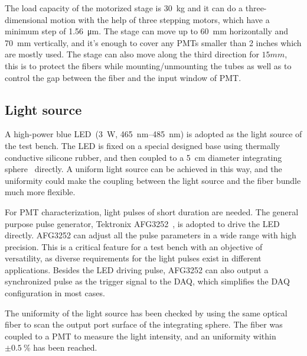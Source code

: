 \documentclass{JINST}
\begin{document}
The load capacity of the motorized stage is \SI{30}{\kilo\gram} and it can do a three-dimensional motion with the help of three stepping motors, which have a minimum step of \SI{1.56}{\micro\meter}.
The stage can move up to \SI{60}{\milli\meter} horizontally and \SI{70}{\milli\meter} vertically, and it's enough to cover any PMTs smaller than 2 inches which are mostly used.
The stage can also move along the third direction for $15mm$, this is to protect the fibers while mounting/unmounting the tubes as well as to control the gap between the fiber and the input window of PMT.
	
\subsection{Light source}
\label{sec:light_source}
	
A high-power blue LED~\cite{z-light}(\SI{3}{\watt},  \SIrange{465}{485}{\nano\meter}) is adopted as the light source of the test bench.
The LED is fixed on a special designed base using thermally conductive silicone rubber, and then coupled to a  \SI{5}{\centi\meter} diameter integrating sphere~\cite{integrating_sphere} directly.
A uniform light source can be achieved in this way, and the uniformity could make the coupling between the light source and the fiber bundle much more flexible.
	
For PMT characterization, light pulses of short duration are needed.
The general purpose pulse generator, Tektronix AFG3252~\cite{afg3252}, is adopted to drive the LED directly.
AFG3252 can adjust all the pulse parameters in a wide range with high precision. This is a critical feature for a test bench with an objective of versatility, as diverse requirements for the light pulses exist in different applications. 
Besides the LED driving pulse, AFG3252 can also output a synchronized pulse as the trigger signal to the DAQ, which  simplifies the DAQ configuration in most cases. 
	
The uniformity of the light source has been checked by using the same optical fiber to scan the output port surface of the integrating sphere. The fiber was coupled to a PMT to measure the light intensity, and an uniformity within $\pm\SI{0.5}{\percent}$ has been reached.
\end{document}
